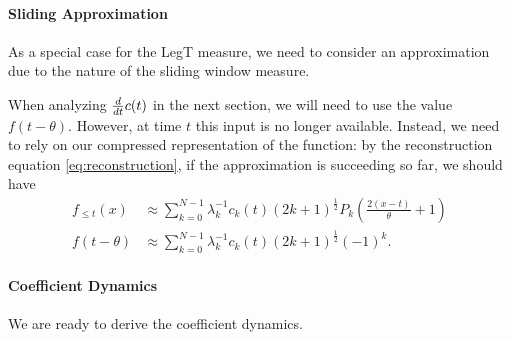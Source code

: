 \documentclass[../../hippo]{subfiles}
\begin{document}
\paragraph{Sliding Approximation}
As a special case for the LegT measure, we need to consider an approximation due to the nature of the sliding window measure.

When analyzing $\frac{d}{d t} c(t)$ in the next section, we will need to use the value $f(t-\theta)$.
However, at time $t$ this input is no longer available.
Instead, we need to rely on our compressed representation of the function:
by the reconstruction equation \eqref{eq:reconstruction}, if the approximation is succeeding so far,
we should have
\begin{align*}
  f_{\leq t}(x) &\approx \sum_{k=0}^{N-1} \lambda_k^{-1} c_k(t) (2k+1)^{\frac{1}{2}} P_k \left( \frac{2(x-t)}{\theta} + 1 \right)
  \\
  f(t-\theta) &\approx \sum_{k=0}^{N-1} \lambda_k^{-1} c_k(t) (2k+1)^{\frac{1}{2}} (-1)^{k}
  .
\end{align*}





\paragraph{Coefficient Dynamics}
We are ready to derive the coefficient dynamics.
\end{document}
